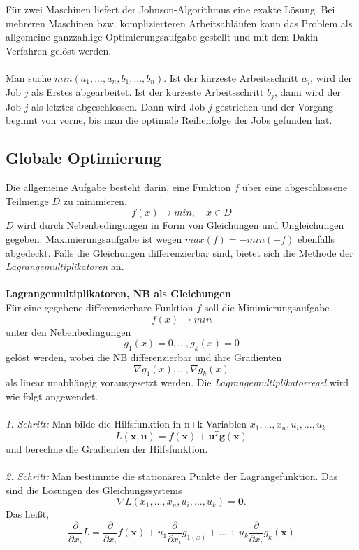 		Für zwei Maschinen liefert der Johnson-Algorithmus eine exakte Lösung. Bei mehreren Maschinen bzw. komplizierteren Arbeitsabläufen kann das Problem als allgemeine ganzzahlige Optimierungsaufgabe gestellt  und mit dem Dakin-Verfahren gelöst werden.\\\\
		Man suche $ min(a_{1}, ...,a_{n},b_{1}, ...,b_{n}) $. Ist der kürzeste Arbeitsschritt $ a_{j} $, wird der Job $ j $ als Erstes abgearbeitet. Ist der kürzeste Arbeitsschritt $ b_{j} $, dann wird der Job $ j $ als letztes abgeschlossen. Dann wird Job $ j $ gestrichen und der Vorgang beginnt von vorne, bis man die optimale Reihenfolge der Jobs gefunden hat.
	
	\subsection{Globale Optimierung}
		Die allgemeine Aufgabe besteht darin, eine Funktion $ f $ über eine abgeschlossene Teilmenge $ D $ zu minimieren.
		\[f(x) \rightarrow min, \quad x\in D\]
		$ D $ wird durch Nebenbedingungen in Form von Gleichungen und Ungleichungen gegeben. Maximierungsaufgabe ist wegen $ max(f) = -min(-f) $ ebenfalls abgedeckt. Falls die Gleichungen differenzierbar sind, bietet sich die Methode der \textit{Lagrangemultiplikatoren} an.
		\leavevmode \\\\
		\textbf{Lagrangemultiplikatoren, NB als Gleichungen}\\
		Für eine gegebene differenzierbare Funktion $ f $ soll die Minimierungsaufgabe
		\[f(x) \rightarrow min\]
		unter den Nebenbedingungen
		\[g_{1}(x)=0, ...,g_{k}(x)=0\]
		gelöst werden, wobei die NB differenzierbar und ihre Gradienten
		\[\nabla g_{1}(x), ...,\nabla g_{k}(x)\]
		als linear unabhängig vorausgesetzt werden. Die \textit{Lagrangemultiplikatorregel} wird wie folgt angewendet.\\\\
		\textit{1. Schritt:} Man bilde die Hilfsfunktion in n+k Variablen $ x_{1}, ...,x_{n},u_{i}, ...,u_{k} $
		\[L(\bm{x},\bm{u}) = f(\bm{x}) + \bm{u}^{T}\bm{g}(\bm{x})\]
		und berechne die Gradienten der Hilfsfunktion.\\\\
		\textit{2. Schritt:} Man bestimmte die stationären Punkte der Lagrangefunktion. Das sind die Lösungen des Gleichungssystems 
		\[\nabla L(x_{1}, ...,x_{n},u_{i}, ...,u_{k}) = \bm{0}.\]
		Das heißt,
		\[\frac{\partial}{\partial x_{i}} L = \frac{\partial}{\partial x_{i}}f(\bm{x}) + u_{1}\frac{\partial}{\partial x_{i}}g_{1(x)}+ ... + u_{k}\frac{\partial}{\partial x_{i}}g_{k}(\bm{x})\]
